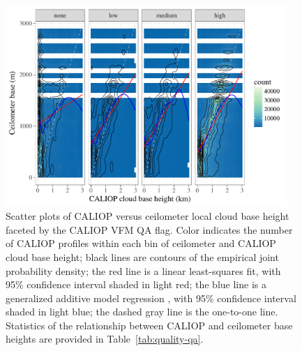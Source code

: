 \documentclass[amt,manuscript]{copernicus}\usepackage[]{graphicx}\usepackage[]{color}
\newenvironment{knitrout}{}{} %
\begin{document}
\begin{figure}
  \centering
\begin{knitrout}
\color{fgcolor}

{\centering \includegraphics[width=0.95\textwidth]{figure/method-eval-qual-1} 

}



\end{knitrout}
  \caption{Scatter plots of CALIOP versus ceilometer local cloud base height
    faceted by the CALIOP VFM QA flag.  Color indicates the number of CALIOP
    profiles within each bin of ceilometer and CALIOP cloud base height; black
    lines are contours of the empirical joint probability density; the red line
    is a linear least-squares fit, with 95\% confidence interval shaded in light
    red; the blue line is a generalized additive model regression
    \citep{Wood2004,Wood2011}, with 95\% confidence interval shaded in light
    blue; the dashed gray line is the one-to-one line.  Statistics of the
    relationship between CALIOP and ceilometer base heights are provided in
    Table~\ref{tab:quality-qa}.}
  \label{fig:quality-qa}
\end{figure}
\end{document}
